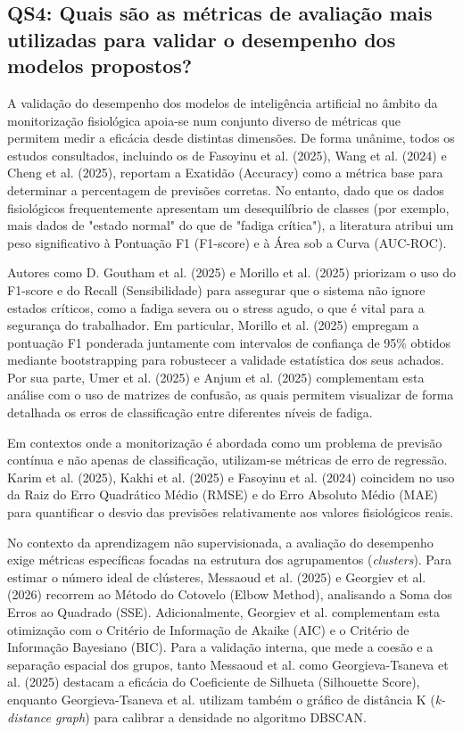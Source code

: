 \subsection*{QS4: Quais são as métricas de avaliação mais utilizadas para validar o desempenho dos modelos propostos?}
\label{subsec:qs4}

A validação do desempenho dos modelos de inteligência artificial no âmbito da monitorização fisiológica apoia-se num conjunto diverso de métricas que permitem medir a eficácia desde distintas dimensões. De forma unânime, todos os estudos consultados, incluindo os de Fasoyinu et al. (2025), Wang et al. (2024) e Cheng et al. (2025)\cite{fasoyinu2025,wang2024,cheng2025}, reportam a Exatidão (Accuracy) como a métrica base para determinar a percentagem de previsões corretas. No entanto, dado que os dados fisiológicos frequentemente apresentam um desequilíbrio de classes (por exemplo, mais dados de "estado normal" do que de "fadiga crítica"), a literatura atribui um peso significativo à Pontuação F1 (F1-score) e à Área sob a Curva (AUC-ROC).

Autores como D. Goutham et al. (2025) e Morillo et al. (2025)\cite{goutham2025,albarran2025} priorizam o uso do F1-score e do Recall (Sensibilidade) para assegurar que o sistema não ignore estados críticos, como a fadiga severa ou o stress agudo, o que é vital para a segurança do trabalhador. Em particular, Morillo et al. (2025) \cite{albarran2025} empregam a pontuação F1 ponderada juntamente com intervalos de confiança de 95\% obtidos mediante bootstrapping para robustecer a validade estatística dos seus achados. Por sua parte, Umer et al. (2025) e Anjum et al. (2025)\cite{umer2025,anjum2025} complementam esta análise com o uso de matrizes de confusão, as quais permitem visualizar de forma detalhada os erros de classificação entre diferentes níveis de fadiga.

Em contextos onde a monitorização é abordada como um problema de previsão contínua e não apenas de classificação, utilizam-se métricas de erro de regressão. Karim et al. (2025), Kakhi et al. (2025) e Fasoyinu et al. (2024)\cite{karim2025,kakhi2025,fasoyinu2025} coincidem no uso da Raiz do Erro Quadrático Médio (RMSE) e do Erro Absoluto Médio (MAE) para quantificar o desvio das previsões relativamente aos valores fisiológicos reais.

No contexto da aprendizagem não supervisionada, a avaliação do desempenho exige métricas específicas focadas na estrutura dos agrupamentos (\textit{clusters}). Para estimar o número ideal de clústeres, Messaoud et al. (2025)\cite{messaoud2025} e Georgiev et al. (2026)\cite{georgiev2026} recorrem ao Método do Cotovelo (Elbow Method), analisando a Soma dos Erros ao Quadrado (SSE). Adicionalmente, Georgiev et al. complementam esta otimização com o Critério de Informação de Akaike (AIC) e o Critério de Informação Bayesiano (BIC). Para a validação interna, que mede a coesão e a separação espacial dos grupos, tanto Messaoud et al. como Georgieva-Tsaneva et al. (2025)\cite{georgieva2025} destacam a eficácia do Coeficiente de Silhueta (Silhouette Score), enquanto Georgieva-Tsaneva et al. utilizam também o gráfico de distância K (\textit{k-distance graph}) para calibrar a densidade no algoritmo DBSCAN. 

